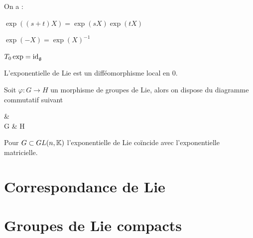 \begin{proposition}
  On a :
  \begin{ilist}
    \item $\exp((s+t)X) = \exp(sX)\exp(tX)$
    \item $\exp(-X) = \exp(X)^{-1}$
    \item $T_0 \exp = \operatorname{id}_\mathfrak{g}$
  \end{ilist}
\end{proposition}

\omitted

\begin{corollary}
  L'exponentielle de Lie est un difféomorphisme local en $0$.
\end{corollary}

\omitted

\begin{theorem}
  Soit $\varphi: G \to H$ un morphisme de groupes de Lie, alors on dispose du diagramme commutatif suivant
  \begin{diag}
     \arrow[r, "T_e\varphi"] \arrow[d, "\exp"] &  \arrow[d, "\exp"] \\
    G \arrow[r, "\varphi"] & H
  \end{diag}
\end{theorem}

\omitted

\begin{proposition}
  Pour $G \subset GL(n, \mathbb{K})$ l'exponentielle de Lie coïncide avec l'exponentielle matricielle.
\end{proposition}

\omitted

\section{Correspondance de Lie}

\section{Groupes de Lie compacts}